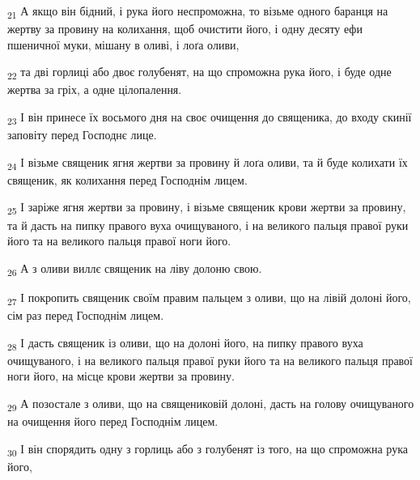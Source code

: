 \begin{tcolorbox}
\textsubscript{21} А якщо він бідний, і рука його неспроможна, то візьме одного баранця на жертву за провину на колихання, щоб очистити його, і одну десяту ефи пшеничної муки, мішану в оливі, і лоґа оливи,
\end{tcolorbox}
\begin{tcolorbox}
\textsubscript{22} та дві горлиці або двоє голубенят, на що спроможна рука його, і буде одне жертва за гріх, а одне цілопалення.
\end{tcolorbox}
\begin{tcolorbox}
\textsubscript{23} І він принесе їх восьмого дня на своє очищення до священика, до входу скинії заповіту перед Господнє лице.
\end{tcolorbox}
\begin{tcolorbox}
\textsubscript{24} І візьме священик ягня жертви за провину й лоґа оливи, та й буде колихати їх священик, як колихання перед Господнім лицем.
\end{tcolorbox}
\begin{tcolorbox}
\textsubscript{25} І заріже ягня жертви за провину, і візьме священик крови жертви за провину, та й дасть на пипку правого вуха очищуваного, і на великого пальця правої руки його та на великого пальця правої ноги його.
\end{tcolorbox}
\begin{tcolorbox}
\textsubscript{26} А з оливи виллє священик на ліву долоню свою.
\end{tcolorbox}
\begin{tcolorbox}
\textsubscript{27} І покропить священик своїм правим пальцем з оливи, що на лівій долоні його, сім раз перед Господнім лицем.
\end{tcolorbox}
\begin{tcolorbox}
\textsubscript{28} І дасть священик із оливи, що на долоні його, на пипку правого вуха очищуваного, і на великого пальця правої руки його та на великого пальця правої ноги його, на місце крови жертви за провину.
\end{tcolorbox}
\begin{tcolorbox}
\textsubscript{29} А позостале з оливи, що на священиковій долоні, дасть на голову очищуваного на очищення його перед Господнім лицем.
\end{tcolorbox}
\begin{tcolorbox}
\textsubscript{30} І він спорядить одну з горлиць або з голубенят із того, на що спроможна рука його,
\end{tcolorbox}
